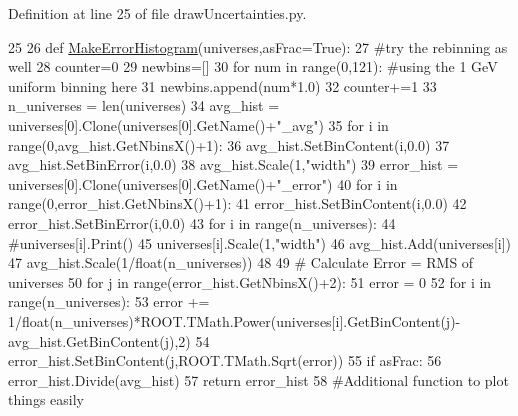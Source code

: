 Definition at line 25 of file draw\-Uncertainties.\-py.


\begin{DoxyCode}
25 
26 \textcolor{keyword}{def }\hyperlink{namespacedraw_uncertainties_a71b82db5bc399553d8d56d4d8ce2b18e}{MakeErrorHistogram}(universes,asFrac=True):
27     \textcolor{comment}{#try the rebinning as well}
28     counter=0
29     newbins=[]
30     \textcolor{keywordflow}{for} num \textcolor{keywordflow}{in}  range(0,121): \textcolor{comment}{#using the 1 GeV uniform binning here}
31         newbins.append(num*1.0)
32         counter+=1
33     n\_universes = len(universes)
34     avg\_hist = universes[0].Clone(universes[0].GetName()+\textcolor{stringliteral}{"\_avg"})
35     \textcolor{keywordflow}{for} i \textcolor{keywordflow}{in} range(0,avg\_hist.GetNbinsX()+1):
36         avg\_hist.SetBinContent(i,0.0)
37         avg\_hist.SetBinError(i,0.0)
38     avg\_hist.Scale(1,\textcolor{stringliteral}{"width"})
39     error\_hist = universes[0].Clone(universes[0].GetName()+\textcolor{stringliteral}{"\_error"})
40     \textcolor{keywordflow}{for} i \textcolor{keywordflow}{in} range(0,error\_hist.GetNbinsX()+1):
41         error\_hist.SetBinContent(i,0.0)
42         error\_hist.SetBinError(i,0.0)
43     \textcolor{keywordflow}{for} i \textcolor{keywordflow}{in} range(n\_universes):
44         \textcolor{comment}{#universes[i].Print()}
45         universes[i].Scale(1,\textcolor{stringliteral}{"width"})
46         avg\_hist.Add(universes[i])
47     avg\_hist.Scale(1/float(n\_universes))
48 
49     \textcolor{comment}{# Calculate Error = RMS of universes}
50     \textcolor{keywordflow}{for} j \textcolor{keywordflow}{in} range(error\_hist.GetNbinsX()+2):
51         error = 0
52         \textcolor{keywordflow}{for} i \textcolor{keywordflow}{in} range(n\_universes):
53             error += 1/float(n\_universes)*ROOT.TMath.Power(universes[i].GetBinContent(j)-
      avg\_hist.GetBinContent(j),2)
54         error\_hist.SetBinContent(j,ROOT.TMath.Sqrt(error))
55     \textcolor{keywordflow}{if} asFrac:
56         error\_hist.Divide(avg\_hist)
57     \textcolor{keywordflow}{return} error\_hist
58 \textcolor{comment}{#Additional function to plot things easily}

\end{DoxyCode}
